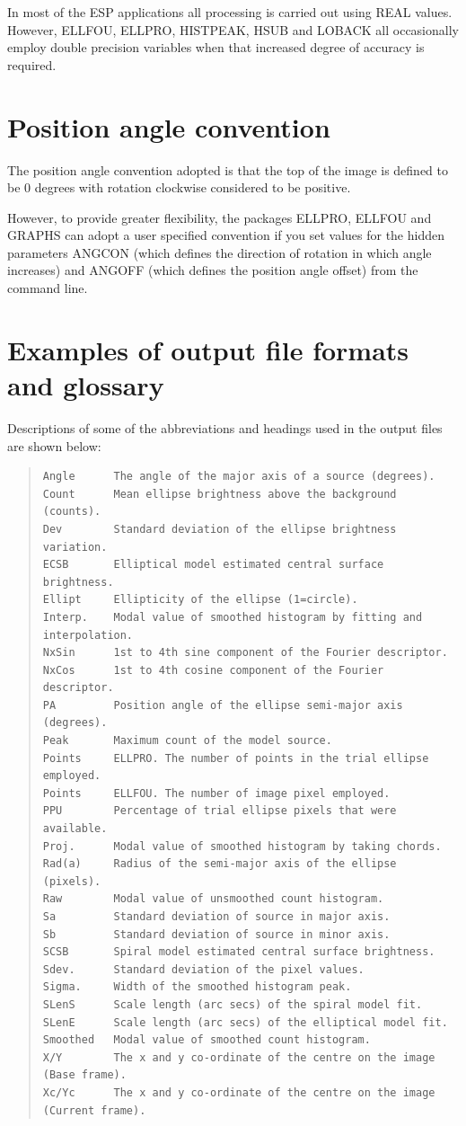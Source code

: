 \documentclass[twoside,11pt]{article}
\newenvironment{myquote}{\begin{quote}\begin{small}}{\end{small}\end{quote}}
\begin{document}
In most of the ESP applications all processing is carried out using REAL values.
However, ELLFOU, ELLPRO, HISTPEAK, HSUB and LOBACK all occasionally employ
double precision variables when that increased degree of accuracy is required.

\section{Position angle convention}

The position angle convention adopted is that the top of the image is 
defined to be 0 degrees with rotation clockwise considered to
be positive. 

However, to provide greater flexibility, the packages ELLPRO, ELLFOU and
GRAPHS can adopt a user specified convention if you set values for the
hidden parameters ANGCON (which defines the direction of rotation
in which angle increases) and ANGOFF (which defines the position angle offset)
from the command line.   

\newpage
\section{Examples of output file formats and glossary}
\label{app:outputfiles}

Descriptions of some of the abbreviations and headings used in the output files
are shown below:

\begin{myquote}
\begin{verbatim}
Angle      The angle of the major axis of a source (degrees).
Count      Mean ellipse brightness above the background (counts). 
Dev        Standard deviation of the ellipse brightness variation.
ECSB       Elliptical model estimated central surface brightness.
Ellipt     Ellipticity of the ellipse (1=circle).  
Interp.    Modal value of smoothed histogram by fitting and interpolation.
NxSin      1st to 4th sine component of the Fourier descriptor.
NxCos      1st to 4th cosine component of the Fourier descriptor.
PA         Position angle of the ellipse semi-major axis (degrees).
Peak       Maximum count of the model source.
Points     ELLPRO. The number of points in the trial ellipse employed.
Points     ELLFOU. The number of image pixel employed.
PPU        Percentage of trial ellipse pixels that were available.  
Proj.      Modal value of smoothed histogram by taking chords.
Rad(a)     Radius of the semi-major axis of the ellipse (pixels).  
Raw        Modal value of unsmoothed count histogram.
Sa         Standard deviation of source in major axis.
Sb         Standard deviation of source in minor axis.
SCSB       Spiral model estimated central surface brightness.
Sdev.      Standard deviation of the pixel values.
Sigma.     Width of the smoothed histogram peak.
SLenS      Scale length (arc secs) of the spiral model fit.
SLenE      Scale length (arc secs) of the elliptical model fit.
Smoothed   Modal value of smoothed count histogram.
X/Y        The x and y co-ordinate of the centre on the image (Base frame).
Xc/Yc      The x and y co-ordinate of the centre on the image (Current frame).
\end{verbatim}
\end{myquote}
\end{document}
